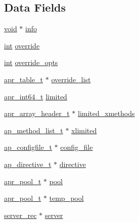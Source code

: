 \subsection*{Data Fields}
\begin{DoxyCompactItemize}
\item 
\hyperlink{group__MOD__ISAPI_gacd6cdbf73df3d9eed42fa493d9b621a6}{void} $\ast$ \hyperlink{structcmd__parms__struct_ab152383653530d6d561449de8690bfbb}{info}
\item 
\hyperlink{pcre_8txt_a42dfa4ff673c82d8efe7144098fbc198}{int} \hyperlink{structcmd__parms__struct_a10a6c1afe5768900849f047c9e9db55e}{override}
\item 
\hyperlink{pcre_8txt_a42dfa4ff673c82d8efe7144098fbc198}{int} \hyperlink{structcmd__parms__struct_abe72299ee12662d37b7f0b494366c6ff}{override\+\_\+opts}
\item 
\hyperlink{structapr__table__t}{apr\+\_\+table\+\_\+t} $\ast$ \hyperlink{structcmd__parms__struct_a59a43d91a92b0c15afc26c0554498b3e}{override\+\_\+list}
\item 
\hyperlink{group__apr__platform_ga4b75afbf973dc6c8aea4ae75b044aa08}{apr\+\_\+int64\+\_\+t} \hyperlink{structcmd__parms__struct_a59b58d3611181b060e135acc4d856c48}{limited}
\item 
\hyperlink{structapr__array__header__t}{apr\+\_\+array\+\_\+header\+\_\+t} $\ast$ \hyperlink{structcmd__parms__struct_ab5e77274ea5f65235ec6a6327a3a2845}{limited\+\_\+xmethods}
\item 
\hyperlink{structap__method__list__t}{ap\+\_\+method\+\_\+list\+\_\+t} $\ast$ \hyperlink{structcmd__parms__struct_affacae1704bf7c29bfbdb39a9e887ab9}{xlimited}
\item 
\hyperlink{structap__configfile__t}{ap\+\_\+configfile\+\_\+t} $\ast$ \hyperlink{structcmd__parms__struct_aad11bde08020eb1db63c2a8b4d4cbf2f}{config\+\_\+file}
\item 
\hyperlink{structap__directive__t}{ap\+\_\+directive\+\_\+t} $\ast$ \hyperlink{structcmd__parms__struct_a4babc19fc6c90ec1e198838acd39b8dc}{directive}
\item 
\hyperlink{structapr__pool__t}{apr\+\_\+pool\+\_\+t} $\ast$ \hyperlink{structcmd__parms__struct_a70b586677914245741baf62bc3cd57b8}{pool}
\item 
\hyperlink{structapr__pool__t}{apr\+\_\+pool\+\_\+t} $\ast$ \hyperlink{structcmd__parms__struct_abb0a920b68fb95aa400babf7a7dcbf9d}{temp\+\_\+pool}
\item 
\hyperlink{structserver__rec}{server\+\_\+rec} $\ast$ \hyperlink{structcmd__parms__struct_ac89b2e2ae2254315b7a2a0df4c633e28}{server}

\end{DoxyCompactItemize}
